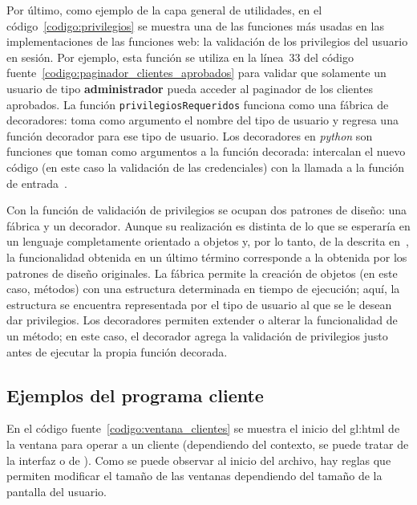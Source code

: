 Por último, como ejemplo de la capa general de utilidades, en el
código~\ref{codigo:privilegios} se muestra una de las funciones más usadas en
las implementaciones de las funciones web: la validación de los privilegios del
usuario en sesión. Por ejemplo, esta función se utiliza en la línea~33 del
código fuente~\ref{codigo:paginador_clientes_aprobados} para validar que
solamente un usuario de tipo \textbf{administrador} pueda acceder al paginador
de los clientes aprobados. La función \texttt{privilegiosRequeridos} funciona
como una fábrica de decoradores: toma como argumento el nombre del tipo de
usuario y regresa una función decorador para ese tipo de usuario. Los
decoradores en \textit{python} son funciones que toman como argumentos a la
función decorada: intercalan el nuevo código (en este caso la validación de las
credenciales) con la llamada a la función de entrada~\cite{python_decoradores}.

Con la función de validación de privilegios se ocupan dos patrones de diseño:
una fábrica y un decorador. Aunque su realización es distinta de lo que se
esperaría en un lenguaje completamente orientado a objetos y, por lo tanto, de
la descrita en~\cite{patrones_de_disenio}, la funcionalidad obtenida en un
último término corresponde a la obtenida por los patrones de diseño originales.
La fábrica permite la creación de objetos (en este caso, métodos) con una
estructura determinada en tiempo de ejecución; aquí, la estructura se encuentra
representada por el tipo de usuario al que se le desean dar privilegios. Los
decoradores permiten extender o alterar la funcionalidad de un método; en este
caso, el decorador agrega la validación de privilegios justo antes de ejecutar
la propia función decorada.


\subsection{Ejemplos del programa cliente}

En el código fuente~\ref{codigo:ventana_clientes} se muestra el inicio del
\gls{gl:html} de la ventana para operar a un cliente (dependiendo del contexto,
se puede tratar de la interfaz  o de
). Como se puede observar al inicio del
archivo, hay reglas que permiten modificar el tamaño de las ventanas dependiendo
del tamaño de la pantalla del usuario.


